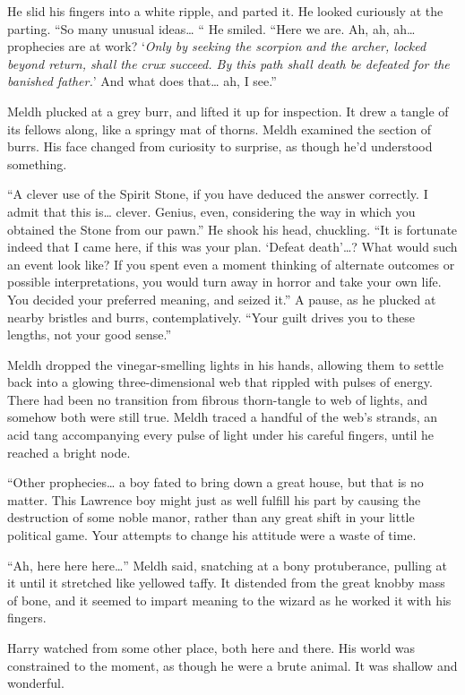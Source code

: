 He slid his fingers into a white ripple, and parted it. He looked
curiously at the parting. ``So many unusual ideas\ldots{} `` He smiled.
``Here we are. Ah, ah, ah\ldots{} prophecies are at work? `\emph{Only by
seeking the scorpion and the archer, locked beyond return, shall the
crux succeed. By this path shall death be defeated for the banished
father.}' And what does that\ldots{} ah, I see.''

Meldh plucked at a grey burr, and lifted it up for inspection. It drew a
tangle of its fellows along, like a springy mat of thorns. Meldh
examined the section of burrs. His face changed from curiosity to
surprise, as though he'd understood something.

``A clever use of the Spirit Stone, if you have deduced the answer
correctly. I admit that this is\ldots{} clever. Genius, even,
considering the way in which you obtained the Stone from our pawn.'' He
shook his head, chuckling. ``It is fortunate indeed that I came here, if
this was your plan. `Defeat death'\ldots? What would such an event look
like? If you spent even a moment thinking of alternate outcomes or
possible interpretations, you would turn away in horror and take your
own life. You decided your preferred meaning, and seized it.'' A pause,
as he plucked at nearby bristles and burrs, contemplatively. ``Your
guilt drives you to these lengths, not your good sense.''

Meldh dropped the vinegar-smelling lights in his hands, allowing them to
settle back into a glowing three-dimensional web that rippled with
pulses of energy. There had been no transition from fibrous thorn-tangle
to web of lights, and somehow both were still true. Meldh traced a
handful of the web's strands, an acid tang accompanying every pulse of
light under his careful fingers, until he reached a bright node.

``Other prophecies\ldots{} a boy fated to bring down a great house, but
that is no matter. This Lawrence boy might just as well fulfill his part
by causing the destruction of some noble manor, rather than any great
shift in your little political game. Your attempts to change his
attitude were a waste of time.

``Ah, here here here\ldots{}'' Meldh said, snatching at a bony
protuberance, pulling at it until it stretched like yellowed taffy. It
distended from the great knobby mass of bone, and it seemed to impart
meaning to the wizard as he worked it with his fingers.

Harry watched from some other place, both here and there. His world was
constrained to the moment, as though he were a brute animal. It was
shallow and wonderful.

